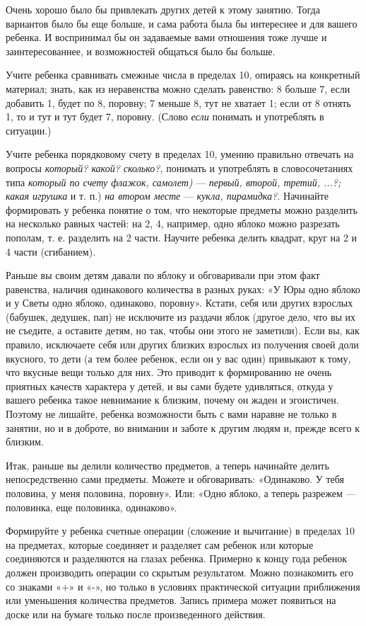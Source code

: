 \documentclass[a5paper]{book}
\renewcommand{\emph}[1]{\textit{#1}}
\begin{document}
Очень хорошо было бы привлекать других детей к этому занятию. Тогда
вариантов было бы еще больше, и сама работа была бы интереснее и для
вашего ребенка. И воспринимал бы он задаваемые вами отношения тоже лучше
и заинтересованнее, и возможностей общаться было бы больше.

Учите ребенка сравнивать смежные числа в пределах 10, опираясь на
конкретный материал; знать, как из неравенства можно сделать равенство:
8 больше 7, если добавить 1, будет по 8, поровну; 7 меньше 8, тут не
хватает 1; если от 8 отнять 1, то и тут и тут будет 7, поровну. (Слово
\emph{если} понимать и употреблять в ситуации.)

Учите ребенка порядковому счету в пределах 10, умению правильно отвечать
на вопросы \emph{который? какой? сколько?,} понимать и употреблять в
словосочетаниях типа \emph{который по счету флажок, самолет)} ---
\emph{первый, второй, третий, ...?; какая игрушка} и т. п.) \emph{на
втором месте} --- \emph{кукла, пирамидка?.} Начинайте формировать у
ребенка понятие о том, что некоторые предметы можно разделить на
несколько равных частей: на 2, 4, например, одно яблоко можно разрезать
пополам, т. е. разделить на 2 части. Научите ребенка делить квадрат,
круг на 2 и 4 части (сгибанием).

Раньше вы своим детям давали по яблоку и обговаривали при этом факт
равенства, наличия одинакового количества в разных руках: «У Юры одно
яблоко и у Светы одно яблоко, одинаково, поровну». Кстати, себя или
других взрослых (бабушек, дедушек, пап) не исключите из раздачи яблок
(другое дело, что вы их не съедите, а оставите детям, но так, чтобы они
этого не заметили). Если вы, как правило, исключаете себя или других
близких взрослых из получения своей доли вкусного, то дети (а тем более
ребенок, если он у вас один) привыкают к тому, что вкусные вещи только
для них. Это приводит к формированию не очень приятных качеств характера
у детей, и вы сами будете удивляться, откуда у вашего ребенка такое
невнимание к близким, почему он жаден и эгоистичен. Поэтому не лишайте,
ребенка возможности быть с вами наравне не только в занятии, но и в
доброте, во внимании и заботе к другим людям и, прежде всего к близким.

Итак, раньше вы делили количество предметов, а теперь начинайте делить
непосредственно сами предметы. Можете и обговаривать: «Одинаково. У тебя
половина, у меня половина, поровну». Или: «Одно яблоко, а теперь
разрежем --- половинка, еще половинка, одинаково».

Формируйте у ребенка счетные операции (сложение и вычитание) в пределах
10 на предметах, которые соединяет и разделяет сам ребенок или которые
соединяются и разделяются на глазах ребенка. Примерно к концу года
ребенок должен производить операции со скрытым результатом. Можно
познакомить его со знаками «+» и «-», но только в условиях практической
ситуации приближения или уменьшения количества предметов. Запись примера
может появиться на доске или на бумаге только после произведенного
действия.
\end{document}
